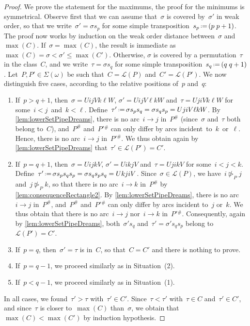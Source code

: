 \documentclass{amsart}
\theoremstyle{definition}
\newcommand{\eqdef}{\mbox{\,\raisebox{0.2ex}{\scriptsize\ensuremath{\mathrm:}}\ensuremath{=}\,}} %
\newcommand{\contact}{^\#} %
\newcommand{\acyclicPipeDreams}{\Sigma} %
\newcommand{\linearExtensions}{\mathcal{L}} %
\newcommand{\more}{\vartriangleright} %
\newcommand{\contactMore}[1]{\more_{#1}} %
\begin{document}
\begin{proof}
We prove the statement for the maximums, the proof for the minimums is symmetrical.
Observe first that we can assume that~$\sigma$ is covered by~$\sigma'$ in weak order, so that we write~${\sigma' = \sigma s_p}$ for some simple transposition~$s_p \eqdef (p \; p+1)$.
The proof now works by induction on the weak order distance between~$\sigma$ and~$\max(C)$.
If~$\sigma = \max(C)$, the result is immediate as~${\max(C) = \sigma < \sigma' \le \max(C')}$.
Otherwise, $\sigma$ is covered by a permutation~$\tau$ in the class~$C$, and we write~$\tau = \sigma s_q$ for some simple transposition~$s_q \eqdef (q \; q+1)$.
Let~$P,P' \in \acyclicPipeDreams(\omega)$ be such that~$C = \linearExtensions(P)$ and~$C' = \linearExtensions(P')$.
We now distinguish five cases, according to the relative positions of~$p$ and~$q$:
\begin{enumerate}[(1)]
\item If~$p > q+1$, then~$\sigma = UijVk\ell W$, $\sigma' = UijV\ell kW$ and~$\tau = UjiVk\ell W$ for some~$i < j$~and~${k < \ell}$. Define~$\tau' \eqdef \sigma s_p s_q = \sigma s_q s_p = UjiV\ell kW$. By \cref{lem:lowerSetPipeDreams}, there is no arc~$i \to j$ in~$P\contact$ (since~$\sigma$ and~$\tau$ both belong to~$C$), and~$P\contact$ and~$P'{}\contact$ can only differ by arcs incident~to~$k$~or~$\ell$. Hence, there is no arc~$i \to j$ in~$P'{}\contact$. We thus obtain again by \cref{lem:lowerSetPipeDreams} that~$\tau' \in \linearExtensions(P') = C'$.
\item If~$p = q+1$, then~$\sigma = UijkV$, $\sigma' = UikjV$ and~$\tau = UjikV$ for some~$i < j < k$. Define~$\tau' \eqdef \sigma s_p s_q s_p = \sigma s_q s_p s_q = UkjiV$. Since~$\sigma \in \linearExtensions(P)$, we have~$i \not\contactMore{P} j$ and~$j \not\contactMore{P} k$, so that there is no arc~$i \to k$ in~$P\contact$ by \cref{lem:consequenceRectangle2}. By \cref{lem:lowerSetPipeDreams}, there is no arc~$i \to j$ in~$P\contact$, and~$P\contact$ and~$P'{}\contact$ can only differ by arcs incident to~$j$ or~$k$. We thus obtain that there is no arc~$i \to j$ nor~$i \to k$ in~$P'{}\contact$. Consequently, again by \cref{lem:lowerSetPipeDreams}, both~$\sigma' s_q$ and~$\tau' = \sigma' s_q s_p$ belong to~$\linearExtensions(P') = C'$.
\item If~$p = q$, then~$\sigma' = \tau$ is in~$C$, so that~$C = C'$ and there is nothing to prove.
\item If~$p = q-1$, we proceed similarly as in Situation~(2).
\item If~$p < q-1$, we proceed similarly as in Situation~(1).
\end{enumerate}
In all cases, we found~$\tau' > \tau$ with~$\tau' \in C'$.
Since~$\tau < \tau'$ with~$\tau \in C$ and~$\tau' \in C'$, and since~$\tau$ is closer to~$\max(C)$ than~$\sigma$, we obtain that ${\max(C) < \max(C')}$ by induction hypothesis.
\end{proof}
\end{document}

